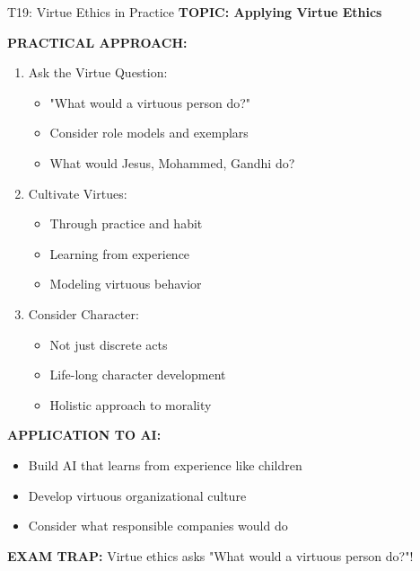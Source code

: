 \documentclass[8pt]{beamer}
\begin{document}
	\begin{frame}{T19: Virtue Ethics in Practice}
		\fontsize{6.5}{7.5}\selectfont
		\textbf{TOPIC: Applying Virtue Ethics}
		
		\vspace{0.1cm}
		\textbf{PRACTICAL APPROACH:}
		\begin{enumerate}
			\item \textcolor{myblue}{Ask the Virtue Question:}
			\begin{itemize}
				\item "What would a virtuous person do?"
				\item Consider role models and exemplars
				\item What would Jesus, Mohammed, Gandhi do?
			\end{itemize}
			\item \textcolor{myblue}{Cultivate Virtues:}
			\begin{itemize}
				\item Through practice and habit
				\item Learning from experience
				\item Modeling virtuous behavior
			\end{itemize}
			\item \textcolor{myblue}{Consider Character:}
			\begin{itemize}
				\item Not just discrete acts
				\item Life-long character development
				\item Holistic approach to morality
			\end{itemize}
		\end{enumerate}
		
		\vspace{0.1cm}
		\textbf{APPLICATION TO AI:}
		\begin{itemize}
			\item Build AI that learns from experience like children
			\item Develop virtuous organizational culture
			\item Consider what responsible companies would do
		\end{itemize}
		
		\textcolor{myred}{\textbf{EXAM TRAP:}} Virtue ethics asks \textcolor{myblue}{"What would a virtuous person do?"}!
	\end{frame}
	
\end{document}
